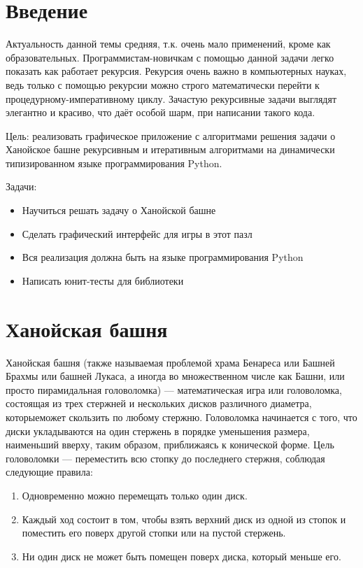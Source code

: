 \section*{Введение}
Актуальность данной темы средняя, т.к. очень мало применений, кроме как
образовательных. Программистам-новичкам с помощью данной задачи легко
показать как работает рекурсия. Рекурсия очень важно в компьютерных 
науках, ведь только с помощью рекурсии можно строго математически
перейти к процедурному-императивному циклу. Зачастую рекурсивные задачи
выглядят элегантно и красиво, что даёт особой шарм, при написании такого
кода.

Цель: реализовать графическое приложение с алгоритмами решения задачи о
Ханойское башне рекурсивным и итеративным алгоритмами на динамически
типизированном языке программирования Python\cite{Python}.

Задачи:
\begin{itemize}
  \item Научиться решать задачу о Ханойской башне
  \item Сделать графический интерфейс для игры в этот пазл
  \item Вся реализация должна быть на языке программирования Python
  \item Написать юнит-тесты для библиотеки
\end{itemize}
\section{Ханойская башня}
Ханойская башня (также называемая проблемой храма Бенареса или Башней
Брахмы или башней Лукаса, а иногда во множественном числе как Башни, или
просто пирамидальная головоломка) --- математическая игра или головоломка,
состоящая из трех стержней и нескольких дисков различного диаметра,
которыеможет скользить по любому стержню. Головоломка начинается с того, что
диски укладываются на один стержень в порядке уменьшения размера, наименьший
вверху, таким образом, приближаясь к конической форме. Цель головоломки ---
переместить всю стопку до последнего стержня, соблюдая следующие правила:

\begin{enumerate}
	\item Одновременно можно перемещать только один диск.
	\item Каждый ход состоит в том, чтобы взять верхний диск из одной из стопок
	      и поместить его поверх другой стопки или на пустой стержень.
	\item Ни один диск не может быть помещен поверх диска, который меньше его.
\end{enumerate}

